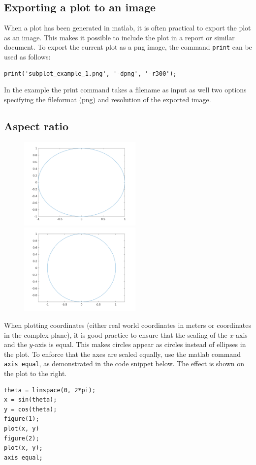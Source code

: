 \subsection{Exporting a plot to an image}

When a plot has been generated in matlab, 
it is often practical to export the plot as an image.
This makes it possible to include the plot in a 
report or similar document.
To export the current plot as a png image, the command
\verb!print! can be used as follows:
\begin{lstlisting}
print('subplot_example_1.png', '-dpng', '-r300');
\end{lstlisting}
In the example the print command takes a filename as input 
as well two options specifying the fileformat (png) 
and resolution of the exported image.


\subsection{Aspect ratio}

\begin{figure}
\includegraphics[width=6cm]{pic/plotting/aspect_ratio_free.png}
\includegraphics[width=6cm]{pic/plotting/aspect_ratio_equal.png}
\end{figure}
When plotting coordinates (either real world coordinates in meters
or coordinates in the complex plane), it is good practice to 
ensure that the scaling of the $x$-axis and the $y$-axis is equal.
This makes circles appear as circles instead of ellipses in the plot.
To enforce that the axes are scaled equally, use the matlab
command \verb!axis equal!, as demonstrated in the code snippet
below.
The effect is shown on the plot to the right.

\begin{lstlisting}
theta = linspace(0, 2*pi);
x = sin(theta);
y = cos(theta);
figure(1);
plot(x, y)
figure(2);
plot(x, y);
axis equal;
\end{lstlisting}




 